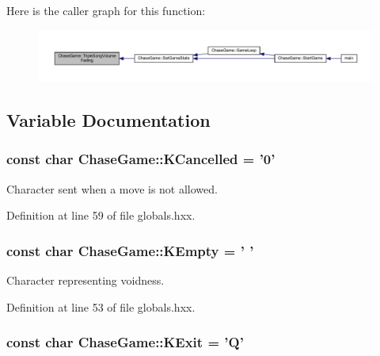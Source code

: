 Here is the caller graph for this function\-:\nopagebreak
\begin{figure}[H]
\begin{center}
\leavevmode
\includegraphics[width=350pt]{namespace_chase_game_a3b9e1d486d981f5332d23142eb4777b7_icgraph}
\end{center}
\end{figure}




\subsection{Variable Documentation}
\hypertarget{namespace_chase_game_a12d6411bb9a72150acba6060bb1587e1}{
\subsubsection[{K\-Cancelled}]{\setlength{\rightskip}{0pt plus 5cm}const char Chase\-Game\-::\-K\-Cancelled = '0'}}\label{namespace_chase_game_a12d6411bb9a72150acba6060bb1587e1}


Character sent when a move is not allowed. 



Definition at line 59 of file globals.\-hxx.

\hypertarget{namespace_chase_game_aa036d4de40188ba2e1aa36ab6cfaf1da}{
\subsubsection[{K\-Empty}]{\setlength{\rightskip}{0pt plus 5cm}const char Chase\-Game\-::\-K\-Empty = ' '}}\label{namespace_chase_game_aa036d4de40188ba2e1aa36ab6cfaf1da}


Character representing voidness. 



Definition at line 53 of file globals.\-hxx.

\hypertarget{namespace_chase_game_a1f787138e31b0a9dc2fbaad3547b246a}{
\subsubsection[{K\-Exit}]{\setlength{\rightskip}{0pt plus 5cm}const char Chase\-Game\-::\-K\-Exit = 'Q'}}\label{namespace_chase_game_a1f787138e31b0a9dc2fbaad3547b246a}


